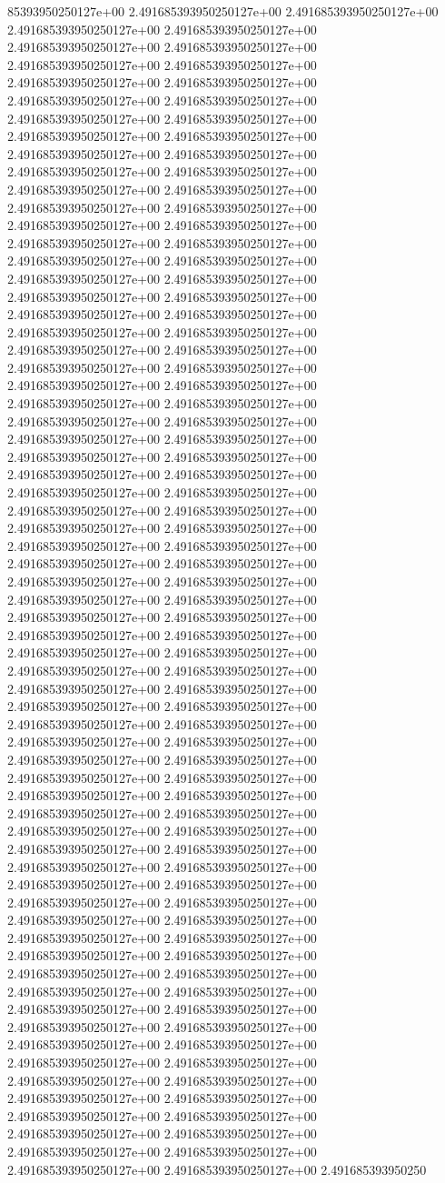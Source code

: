85393950250127e+00	2.491685393950250127e+00	2.491685393950250127e+00	2.491685393950250127e+00	2.491685393950250127e+00	2.491685393950250127e+00	2.491685393950250127e+00	2.491685393950250127e+00	2.491685393950250127e+00	2.491685393950250127e+00	2.491685393950250127e+00	2.491685393950250127e+00	2.491685393950250127e+00	2.491685393950250127e+00	2.491685393950250127e+00	2.491685393950250127e+00	2.491685393950250127e+00	2.491685393950250127e+00	2.491685393950250127e+00	2.491685393950250127e+00	2.491685393950250127e+00	2.491685393950250127e+00	2.491685393950250127e+00	2.491685393950250127e+00	2.491685393950250127e+00	2.491685393950250127e+00	2.491685393950250127e+00	2.491685393950250127e+00	2.491685393950250127e+00	2.491685393950250127e+00	2.491685393950250127e+00	2.491685393950250127e+00	2.491685393950250127e+00	2.491685393950250127e+00	2.491685393950250127e+00	2.491685393950250127e+00	2.491685393950250127e+00	2.491685393950250127e+00	2.491685393950250127e+00	2.491685393950250127e+00	2.491685393950250127e+00	2.491685393950250127e+00	2.491685393950250127e+00	2.491685393950250127e+00	2.491685393950250127e+00	2.491685393950250127e+00	2.491685393950250127e+00	2.491685393950250127e+00	2.491685393950250127e+00	2.491685393950250127e+00	2.491685393950250127e+00	2.491685393950250127e+00	2.491685393950250127e+00	2.491685393950250127e+00	2.491685393950250127e+00	2.491685393950250127e+00	2.491685393950250127e+00	2.491685393950250127e+00	2.491685393950250127e+00	2.491685393950250127e+00	2.491685393950250127e+00	2.491685393950250127e+00	2.491685393950250127e+00	2.491685393950250127e+00	2.491685393950250127e+00	2.491685393950250127e+00	2.491685393950250127e+00	2.491685393950250127e+00	2.491685393950250127e+00	2.491685393950250127e+00	2.491685393950250127e+00	2.491685393950250127e+00	2.491685393950250127e+00	2.491685393950250127e+00	2.491685393950250127e+00	2.491685393950250127e+00	2.491685393950250127e+00	2.491685393950250127e+00	2.491685393950250127e+00	2.491685393950250127e+00	2.491685393950250127e+00	2.491685393950250127e+00	2.491685393950250127e+00	2.491685393950250127e+00	2.491685393950250127e+00	2.491685393950250127e+00	2.491685393950250127e+00	2.491685393950250127e+00	2.491685393950250127e+00	2.491685393950250127e+00	2.491685393950250127e+00	2.491685393950250127e+00	2.491685393950250127e+00	2.491685393950250127e+00	2.491685393950250127e+00	2.491685393950250127e+00	2.491685393950250127e+00	2.491685393950250127e+00	2.491685393950250127e+00	2.491685393950250127e+00	2.491685393950250127e+00	2.491685393950250127e+00	2.491685393950250127e+00	2.491685393950250127e+00	2.491685393950250127e+00	2.491685393950250127e+00	2.491685393950250127e+00	2.491685393950250127e+00	2.491685393950250127e+00	2.491685393950250127e+00	2.491685393950250127e+00	2.491685393950250127e+00	2.491685393950250127e+00	2.491685393950250127e+00	2.491685393950250127e+00	2.491685393950250127e+00	2.491685393950250127e+00	2.491685393950250127e+00	2.491685393950250127e+00	2.491685393950250127e+00	2.491685393950250127e+00	2.491685393950250127e+00	2.491685393950250127e+00	2.491685393950250127e+00	2.491685393950250127e+00	2.491685393950250127e+00	2.491685393950250127e+00	2.491685393950250127e+00	2.491685393950250127e+00	2.491685393950250127e+00	2.491685393950250127e+00	2.491685393950250127e+00	2.491685393950250127e+00	2.491685393950250